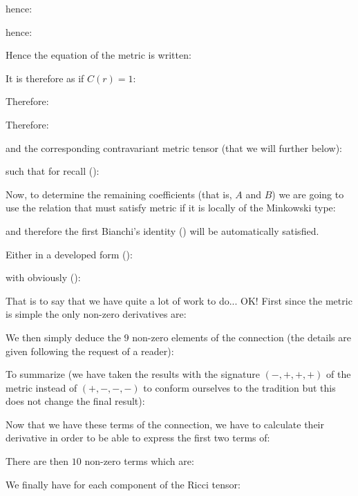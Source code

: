 	hence:
	
	hence:
	
	Hence the equation of the metric is written:
	
	It is therefore as if $C(r)=1$:
	
	Therefore:
	
	Therefore:
	
	and the corresponding contravariant metric tensor (that we will further below):
	
	such that for recall ():
	
	Now, to determine the remaining coefficients (that is, $A$ and $B$) we are going to use the relation that must satisfy metric if it is locally of the Minkowski type:
	
	and therefore the first Bianchi's identity () will be automatically satisfied.

	Either in a developed form ():
	
	with obviously ():
	
	That is to say that we have quite a lot of work to do... OK! First since the metric is simple the only non-zero derivatives are:	
	
	We then simply deduce the $9$ non-zero elements of the connection (the details are given following the request of a reader):
	
	
	
	
	
	
	
	
	
	
	
	
	
	
	
	
	
	To summarize (we have taken the results with the signature $(-, +, +, +)$ of the metric instead of $(+, -, -, -)$ to conform ourselves to the tradition but this does not change the final result):
	
	Now that we have these terms of the connection, we have to calculate their derivative in order to be able to express the first two terms of:
	
	There are then $10$ non-zero terms which are:
	
	We finally have for each component of the Ricci tensor:
	
